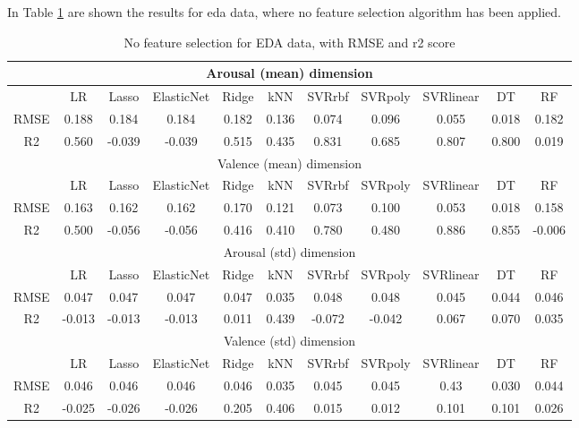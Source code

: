 \newpage
In Table \ref{table:eda_no_fs} are shown the results for \gls{eda} data, where no feature selection algorithm has been applied.
\\
\begin{table}[h!]
\begin{adjustwidth}{-3cm}{-1cm}
	\centering
	\begin{tabular}{|c|c|c|c|c|c|c|c|c|c|c|}
		\hline \multicolumn{11}{|c|}{Arousal (mean) dimension} \\
		\hline & LR & Lasso & ElasticNet & Ridge & kNN & SVRrbf & SVRpoly & SVRlinear & DT & RF \\
		\hline RMSE & 0.188 & 0.184 & 0.184 & 0.182 & 0.136 & 0.074 & 0.096 & 0.055 & \cellcolor{yellow}0.018 & 0.182 \\
		\hline R2 & 0.560 & -0.039 & -0.039 & 0.515 & 0.435 & \cellcolor{yellow}0.831 & 0.685 & 0.807 & 0.800 & 0.019 \\
		\hline \hline  \multicolumn{11}{|c|}{Valence (mean) dimension} \\
		\hline & LR & Lasso & ElasticNet & Ridge & kNN & SVRrbf & SVRpoly & SVRlinear & DT & RF \\
		\hline RMSE & 0.163 & 0.162 & 0.162 & 0.170 & 0.121 & 0.073 & 0.100 & 0.053 & \cellcolor{yellow}0.018 & 0.158 \\
		\hline R2 & 0.500 & -0.056 & -0.056 & 0.416 & 0.410 & 0.780 & 0.480 & \cellcolor{yellow}0.886 & 0.855 & -0.006 \\
		\hline \hline  \multicolumn{11}{|c|}{Arousal (std) dimension} \\
		\hline & LR & Lasso & ElasticNet & Ridge & kNN & SVRrbf & SVRpoly & SVRlinear & DT & RF \\
		\hline RMSE & 0.047 & 0.047 & 0.047 & 0.047 & 0.035 & 0.048 & 0.048 & 0.045 & \cellcolor{yellow}0.044 & 0.046 \\
		\hline R2 & -0.013 & -0.013 & -0.013 & 0.011 & \cellcolor{yellow}0.439 & -0.072 & -0.042 & 0.067 & 0.070 & 0.035 \\
		\hline \hline  \multicolumn{11}{|c|}{Valence (std) dimension} \\
		\hline & LR & Lasso & ElasticNet & Ridge & kNN & SVRrbf & SVRpoly & SVRlinear & DT & RF \\
		\hline RMSE & 0.046 & 0.046 & 0.046 & 0.046 & 0.035 & 0.045 & 0.045 & 0.43 & \cellcolor{yellow}0.030 & 0.044 \\
		\hline R2 & -0.025 & -0.026 & -0.026 & 0.205 & \cellcolor{yellow}0.406 & 0.015 & 0.012 & 0.101 & 0.101 & 0.026 \\
		\hline
	\end{tabular}
	\end{adjustwidth}
	\caption{No feature selection for EDA data, with RMSE and r2 score}
	\label{table:eda_no_fs}
\end{table}

